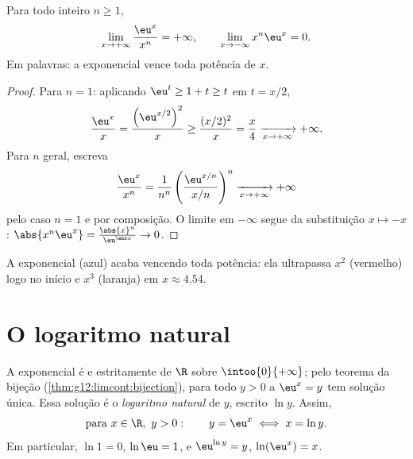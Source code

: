 \begin{theorem}\label{thm:g12:exp:growth}
Para todo inteiro $n \geq 1$,
\[
\lim_{x\to+\infty} \frac{\eu^x}{x^n} = +\infty,
\qquad
\lim_{x\to-\infty} x^n \eu^x = 0 .
\]
Em palavras: a exponencial vence toda potência de $x$.
\end{theorem}

\begin{proof}
Para $n = 1$: aplicando $\eu^t \geq 1 + t \geq t$ em $t = x/2$,
\[
\frac{\eu^x}{x} = \frac{\left(\eu^{x/2}\right)^2}{x}
\geq \frac{(x/2)^2}{x} = \frac{x}{4} \xrightarrow[x\to+\infty]{} +\infty .
\]
Para $n$ geral, escreva
\[
\frac{\eu^x}{x^n}
= \frac{1}{n^n}\left(\frac{\eu^{x/n}}{x/n}\right)^{n}
\xrightarrow[x\to+\infty]{} +\infty
\]
pelo caso $n=1$ e por composição. O limite em $-\infty$ segue da
substituição $x \mapsto -x$:
$\abs{x^n \eu^x} = \frac{\abs{x}^n}{\eu^{\abs x}} \to 0$.
\end{proof}

\begin{omfigure}

{\small A exponencial (azul) acaba vencendo toda potência: ela ultrapassa
$x^2$ (vermelho) logo no início e $x^3$ (laranja) em $x \approx 4.54$.}
\end{omfigure}

\section{O logaritmo natural}

\begin{definition}\label{def:g12:exp:ln}
A exponencial é  e estritamente  de $\R$ sobre
$\intoo{0}{+\infty}$; pelo teorema da bijeção
(\cref{thm:g12:limcont:bijection}), para todo $y > 0$ a 
$\eu^x = y$ tem solução única. Essa solução é o \emph{logaritmo
natural} de $y$, escrito $\ln y$. Assim,
\[
\text{para } x \in \R,\ y > 0: \qquad y = \eu^x \iff x = \ln y .
\]
Em particular, $\ln 1 = 0$, $\ln \eu = 1$, e $\eu^{\ln y} = y$,
$\ln(\eu^x) = x$.
\end{definition}

